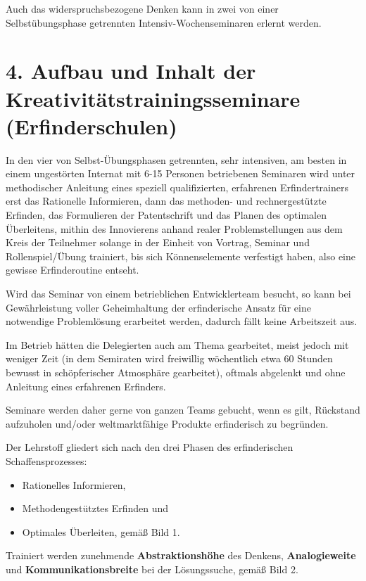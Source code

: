 \documentclass[11pt,a4paper]{article}
\begin{document}
Auch das widerspruchsbezogene Denken kann in zwei von einer Selbstübungsphase
getrennten Intensiv-Wochenseminaren erlernt werden.

\section*{4. Aufbau und Inhalt der Kreativitätstrainingsseminare
  (Erfinderschulen)} 

In den vier von Selbst-Übungsphasen getrennten, sehr intensiven, am besten in
einem ungestörten Internat mit 6-15 Personen betriebenen Seminaren wird
unter methodischer Anleitung eines speziell qualifizierten, erfahrenen
Erfindertrainers erst das Rationelle Informieren, dann das methoden- und
rechnergestützte Erfinden, das Formulieren der Patentschrift und das
Planen des optimalen Überleitens, mithin des Innovierens anhand realer
Problemstellungen aus dem Kreis der Teilnehmer solange in der Einheit von
Vortrag, Seminar und Rollenspiel/Übung trainiert, bis sich Könnenselemente
verfestigt haben, also eine gewisse Erfinderoutine entseht.

Wird das Seminar von einem betrieblichen Entwicklerteam besucht, so kann bei
Gewähr\-leis\-tung voller Geheimhaltung der erfinderische Ansatz für eine
notwendige Problemlösung erarbeitet werden, dadurch fällt keine Arbeitszeit
aus.

Im Betrieb hätten die Delegierten auch am Thema gearbeitet, meist jedoch mit
weniger Zeit (in dem Semiraten wird freiwillig wöchentlich etwa 60 Stunden
bewusst in schöpferischer Atmosphäre gearbeitet), oftmals abgelenkt und ohne
Anleitung eines erfahrenen Erfinders.

Seminare werden daher gerne von ganzen Teams gebucht, wenn es gilt, Rückstand 
aufzuholen und/oder weltmarktfähige Produkte erfinderisch zu begründen.

Der Lehrstoff gliedert sich nach den drei Phasen des erfinderischen
Schaffensprozesses:
\begin{itemize}[noitemsep]
\item Rationelles Informieren,
\item Methodengestütztes Erfinden und
\item Optimales Überleiten, gemäß Bild 1.
\end{itemize}
Trainiert werden zunehmende \textbf{Abstraktionshöhe} des Denkens,
\textbf{Analogieweite} und \textbf{Kommunikationsbreite} bei der Lösungssuche,
gemäß Bild 2.
\end{document}
